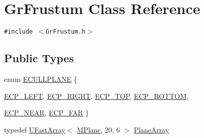 \hypertarget{class_gr_frustum}{
\section{GrFrustum Class Reference}
\label{class_gr_frustum}
}
{\tt \#include $<$GrFrustum.h$>$}

\subsection*{Public Types}
\begin{CompactItemize}
\item 
enum \hyperlink{class_gr_frustum_75e33130cc18abc48f5f210454a62184}{ECULLPLANE} \{ \par
\hyperlink{class_gr_frustum_75e33130cc18abc48f5f210454a6218403ae9beec0a454238994b124cfc0f9a7}{ECP\_\-LEFT}, 
\hyperlink{class_gr_frustum_75e33130cc18abc48f5f210454a6218437ef60da732d0b34020a8c5a471218f6}{ECP\_\-RIGHT}, 
\hyperlink{class_gr_frustum_75e33130cc18abc48f5f210454a62184489862a8c803515cb52be640ecdc07e3}{ECP\_\-TOP}, 
\hyperlink{class_gr_frustum_75e33130cc18abc48f5f210454a62184685302e38b9023048e6acbe92d7d3281}{ECP\_\-BOTTOM}, 
\par
\hyperlink{class_gr_frustum_75e33130cc18abc48f5f210454a62184648e81f516e9a48aab7622e69e3df87e}{ECP\_\-NEAR}, 
\hyperlink{class_gr_frustum_75e33130cc18abc48f5f210454a62184d3d2ae43f8489c8f6e5bb79330aebd0c}{ECP\_\-FAR}
 \}
\item 
typedef \hyperlink{class_u_fast_array}{UFastArray}$<$ \hyperlink{class_m_plane}{MPlane}, 20, 6 $>$ \hyperlink{class_gr_frustum_0329f74100ff09e4eb6e1605ce9dcb35}{PlaneArray}

\end{CompactItemize}
